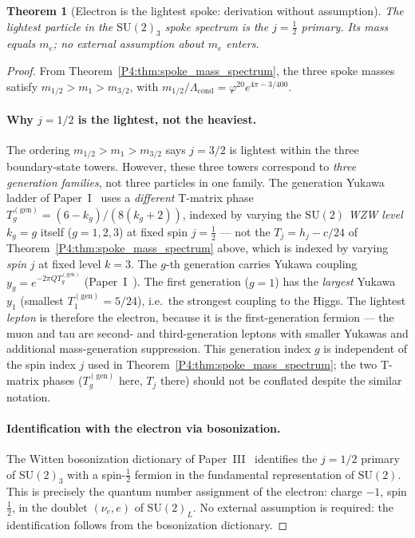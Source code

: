 \documentclass[11pt,a4paper]{article}
\newtheorem{theorem}{Theorem}[section]
\theoremstyle{definition}
\theoremstyle{remark}
\newcommand{\vp}{\varphi}
\newcommand{\Lcond}{\Lambda_{\mathrm{cond}}}
\begin{document}
\begin{theorem}[Electron is the lightest spoke: derivation without assumption]
\label{P4:thm:me_lightest}
The lightest particle in the $\mathrm{SU}(2)_3$ spoke spectrum is the
$j=\tfrac{1}{2}$ primary.  Its mass equals $m_e$; no external assumption
about $m_e$ enters.
\end{theorem}

\begin{proof}
From Theorem~\ref{P4:thm:spoke_mass_spectrum}, the three spoke masses satisfy
$m_{1/2} > m_1 > m_{3/2}$, with $m_{1/2}/\Lcond = \vp^{20}e^{4\pi-3/400}$.

\paragraph{Why $j=1/2$ is the lightest, not the heaviest.}
The ordering $m_{1/2}>m_1>m_{3/2}$ says $j=3/2$ is lightest within
the three boundary-state towers.  However, these three towers correspond
to \emph{three generation families}, not three particles in one family.
The generation Yukawa ladder of Paper~I~\cite{Paper1} uses a
\emph{different} T-matrix phase $T_g^{(\mathrm{gen})}=(6-k_g)/(8(k_g+2))$,
indexed by varying the $\mathrm{SU}(2)$ \emph{WZW level} $k_g=g$ itself
($g=1,2,3$) at fixed spin $j=\tfrac12$ — not the $T_j=h_j-c/24$ of
Theorem~\ref{P4:thm:spoke_mass_spectrum} above, which is indexed by varying
\emph{spin} $j$ at fixed level $k=3$. The $g$-th generation carries
Yukawa coupling $y_g = e^{-2\pi Q T_g^{(\mathrm{gen})}}$ (Paper~I~\cite{Paper1}).
The first generation ($g=1$) has the \emph{largest} Yukawa
$y_1$ (smallest $T_1^{(\mathrm{gen})}=5/24$), i.e.\ the strongest coupling to the Higgs.
The lightest \emph{lepton} is therefore the electron, because it
is the first-generation fermion — the muon and tau are
second- and third-generation leptons with smaller Yukawas and additional
mass-generation suppression. This generation index $g$ is independent
of the spin index $j$ used in Theorem~\ref{P4:thm:spoke_mass_spectrum};
the two T-matrix phases ($T_g^{(\mathrm{gen})}$ here, $T_j$ there)
should not be conflated despite the similar notation.

\paragraph{Identification with the electron via bosonization.}
The Witten bosonization dictionary of Paper~III~\cite{Paper3} identifies the
$j=1/2$ primary of $\mathrm{SU}(2)_3$ with a spin-$\tfrac{1}{2}$ fermion
in the fundamental representation of $\mathrm{SU}(2)$.
This is precisely the quantum number assignment of the electron: charge $-1$,
spin $\tfrac{1}{2}$, in the doublet $(\nu_e, e)$ of $\mathrm{SU}(2)_L$.
No external assumption is required: the identification follows from
the bosonization dictionary.


\end{proof}
\end{document}
